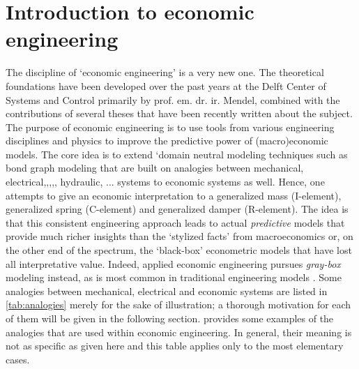 \section{Introduction to economic engineering}
The discipline of `economic engineering' is a very new one. The theoretical foundations have been developed over the past years at the Delft Center of Systems and Control primarily by prof. em. dr. ir. Mendel, combined with the contributions of several theses that have been recently written about the subject. The purpose of economic engineering is to use tools from various engineering disciplines and physics to improve the predictive power of (macro)economic models. The core idea is to extend `domain neutral modeling techniques such as bond graph modeling \cite{Karnopp2012} that are built on analogies between mechanical, electrical,,,,, hydraulic, ... systems to economic systems as well. Hence, one attempts to give an economic interpretation to a generalized mass (I-element), generalized spring (C-element) and generalized damper (R-element). The idea is that this consistent engineering approach leads to actual \emph{predictive} models that provide much richer insights than the `stylized facts' from macroeconomics or, on the other end of the spectrum, the `black-box' econometric models that have lost all interpretative value. Indeed, applied economic engineering pursues \emph{gray-box} modeling instead, as is most common in traditional engineering models \cite{Kruimer2021}. Some analogies between mechanical, electrical and economic systems are listed in \cref{tab:analogies} merely for the sake of illustration; a thorough motivation for each of them will be given in the following section.  provides some examples of the analogies that are used within economic engineering. In general, their meaning is not as specific as given here and this table applies only to the most elementary cases. 
